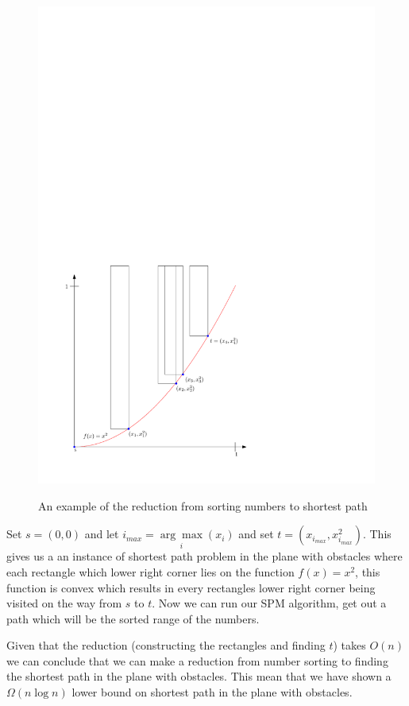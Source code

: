 \begin{figure}[H]
	\includegraphics{figures/reduction.pdf}
	\label{fig:reduction}
	\caption{An example of the reduction from sorting numbers to shortest path}
\end{figure}

Set $s=(0,0)$ and let
$i_{max}=\underset{i}{\arg\max}(x_i)$ and set $t=(x_{i_{max}},x_{i_{max}}^2)$.
This gives us a an instance of shortest path problem in the plane with obstacles where
each rectangle which lower right corner lies on the
function $f(x)=x^2$, this function is convex which results in every rectangles
lower right corner being visited on the way from $s$ to $t$. Now we can run our
SPM algorithm, get out a path which will be the sorted range of the numbers.

Given that the reduction (constructing the rectangles and finding $t$) takes
$O(n)$ we can conclude that we can make a reduction from number sorting to
finding the shortest path in the plane with obstacles. This mean that we have
shown a $\Omega{(n\log n)}$ lower bound on shortest path in the plane with obstacles.
